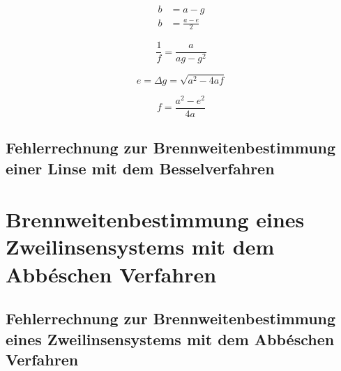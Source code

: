 \begin{align} \label{Relation}
    b &= a - g   \\
    \nonumber b &= \frac{a-e}{2} 
\end{align}

\begin{equation} \label{Gleichung}
    \frac{1}{f} = \frac{a}{ag-g^2}
\end{equation}

\begin{equation} \label{Defe}
    e = \Delta g = \sqrt{a^2-4af}
\end{equation}

\begin{equation} \label{Gleichungf}
    f = \frac{a^2-e^2}{4a}
\end{equation}


\subsection{Fehlerrechnung zur Brennweitenbestimmung einer Linse mit dem Besselverfahren}


\section{Brennweitenbestimmung eines Zweilinsensystems mit dem Abbéschen Verfahren}

\subsection{Fehlerrechnung zur Brennweitenbestimmung eines Zweilinsensystems mit dem Abbéschen Verfahren}